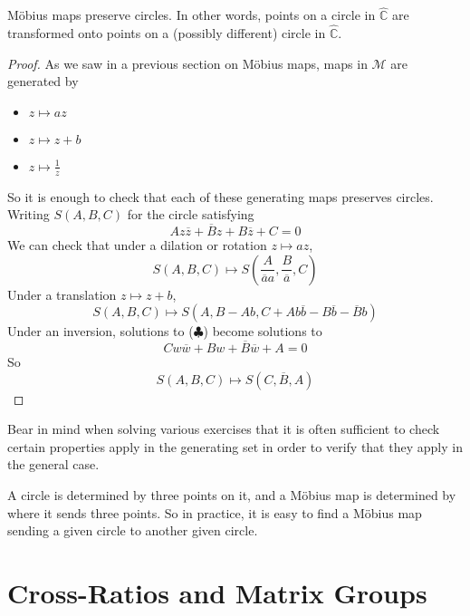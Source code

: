 \documentclass{article}
\begin{document}
\begin{theorem}
	M\"obius maps preserve circles. In other words, points on a circle in $\hat{\mathbb C}$ are transformed onto points on a (possibly different) circle in $\hat{\mathbb C}$.
\end{theorem}
\begin{proof}
	As we saw in a previous section on M\"obius maps, maps in $\mathcal M$ are generated by
	\begin{itemize}
		\item $z \mapsto az$
		\item $z \mapsto z + b$
		\item $z \mapsto \frac{1}{z}$
	\end{itemize}
	So it is enough to check that each of these generating maps preserves circles. Writing $S(A, B, C)$ for the circle satisfying
	\[ Az\overline z + \overline B z + B \overline z + C = 0 \tag{$\clubsuit$} \]
	We can check that under a dilation or rotation $z \mapsto az$,
	\[ S(A, B, C) \mapsto S\left( \frac{A}{\overline a a}, \frac{B}{\overline a}, C \right) \]
	Under a translation $z \mapsto z + b$,
	\[ S(A, B, C) \mapsto S\left( A, B-Ab, C+Ab\overline b - B\overline b - \overline B b \right) \]
	Under an inversion, solutions to ($\clubsuit$) become solutions to
	\[ Cw\overline w + Bw + \overline B\overline w + A = 0 \]
	So
	\[ S(A, B, C) \mapsto S(C, \overline B, A) \]
\end{proof}
Bear in mind when solving various exercises that it is often sufficient to check certain properties apply in the generating set in order to verify that they apply in the general case.

\begin{remark}
	A circle is determined by three points on it, and a M\"obius map is determined by where it sends three points. So in practice, it is easy to find a M\"obius map sending a given circle to another given circle.
\end{remark}

\section{Cross-Ratios and Matrix Groups}
\end{document}
